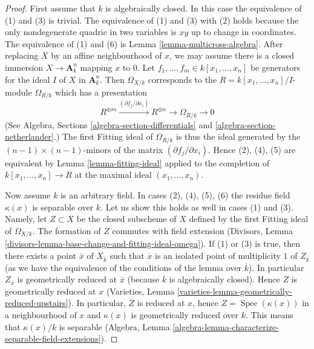 \documentclass[10pt,a4paper]{amsart}
\theoremstyle{plain}
\theoremstyle{definition}
\theoremstyle{remark}
\numberwithin{equation}{subsection}
\def\Spec{\mathop{\mathrm{Spec}}}
\begin{document}
\begin{proof}
First assume that $k$ is algebraically closed.
In this case the equivalence of (1) and (3) is trivial.
The equivalence of (1) and (3) with (2) holds because the only
nondegenerate quadric in two variables is $xy$ up to change in
coordinates. The equivalence of (1) and (6) is 
Lemma \ref{lemma-multicross-algebra}.
After replacing $X$ by an affine neighbourhood
of $x$, we may assume there is a closed immersion $X \to \mathbf{A}^n_k$
mapping $x$ to $0$. Let $f_1, \ldots, f_m \in k[x_1, \ldots, x_n]$
be generators for the ideal $I$ of $X$ in $\mathbf{A}^n_k$.
Then $\Omega_{X/k}$ corresponds to the $R = k[x_1, \ldots, x_n]/I$-module
$\Omega_{R/k}$ which has a presentation
$$
R^{\oplus m} \xrightarrow{(\partial f_j/\partial x_i)}
R^{\oplus n} \to \Omega_{R/k} \to 0
$$
(See Algebra, Sections \ref{algebra-section-differentials} and
\ref{algebra-section-netherlander}.)
The first Fitting ideal of $\Omega_{R/k}$ is thus the ideal
generated by the $(n - 1) \times (n - 1)$-minors of the
matrix $(\partial f_j/\partial x_i)$. Hence (2), (4), (5)
are equivalent by Lemma \ref{lemma-fitting-ideal} applied
to the completion of $k[x_1, \ldots, x_n] \to R$
at the maximal ideal $(x_1, \ldots, x_n)$.

\medskip\noindent
Now assume $k$ is an arbitrary field.
In cases (2), (4), (5), (6) the residue field $\kappa(x)$ is
separable over $k$. Let us show this holds as well
in cases (1) and (3). Namely, let $Z \subset X$ be the closed subscheme
of $X$ defined by the first Fitting ideal of $\Omega_{X/k}$.
The formation of $Z$ commutes with field extension
(Divisors, Lemma \ref{divisors-lemma-base-change-and-fitting-ideal-omega}).
If (1) or (3) is true, then there exists a point
$\overline{x}$ of $X_{\overline{k}}$ such that $\overline{x}$
is an isolated point of multiplicity $1$ of $Z_{\overline{k}}$ (as we have the
equivalence of the conditions of the lemma over $\overline{k}$).
In particular $Z_{\overline{x}}$ is geometrically reduced at $\overline{x}$
(because $\overline{k}$ is algebraically closed). Hence
$Z$ is geometrically reduced at $x$
(Varieties, Lemma \ref{varieties-lemma-geometrically-reduced-upstairs}).
In particular, $Z$ is reduced at $x$, hence $Z = \Spec(\kappa(x))$
in a neighbourhood of $x$ and $\kappa(x)$ is geometrically reduced
over $k$. This means that $\kappa(x)/k$ is separable
(Algebra, Lemma \ref{algebra-lemma-characterize-separable-field-extensions}).


\end{proof}
\end{document}
